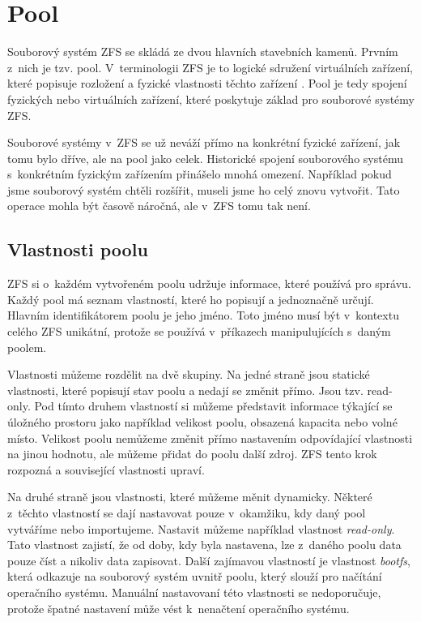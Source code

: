 \section{Pool}
Souborový systém ZFS se skládá ze dvou hlavních stavebních kamenů. Prvním z~nich je tzv. pool. V~terminologii ZFS je to logické sdružení virtuálních zařízení, které popisuje rozložení a fyzické vlastnosti těchto zařízení \cite{terminology}. Pool je tedy spojení fyzických nebo virtuálních zařízení, které poskytuje základ pro souborové systémy ZFS.

Souborové systémy v~ZFS se už neváží přímo na konkrétní fyzické zařízení, jak tomu bylo dříve, ale na pool jako celek. Historické spojení souborového systému s~konkrétním fyzickým zařízením přinášelo mnohá omezení. Například pokud jsme souborový systém chtěli rozšířit, museli jsme ho celý znovu vytvořit. Tato operace mohla být časově náročná, ale v~ZFS tomu tak není.
\subsection{Vlastnosti poolu}
ZFS si o~každém vytvořeném poolu udržuje informace, které používá pro správu. Každý pool má seznam vlastností, které ho popisují a jednoznačně určují.
Hlavním identifikátorem poolu je jeho jméno. Toto jméno musí být v~kontextu celého ZFS unikátní, protože se používá v~příkazech manipulujících s~daným poolem.

Vlastnosti můžeme rozdělit na dvě skupiny. Na jedné straně jsou statické vlastnosti, které popisují stav poolu a nedají se změnit přímo. Jsou tzv. read-only. Pod tímto druhem vlastností si můžeme představit informace týkající se úložného prostoru jako například velikost poolu, obsazená kapacita nebo volné místo. Velikost poolu nemůžeme změnit přímo nastavením odpovídající vlastnosti na jinou hodnotu, ale můžeme přidat do poolu další zdroj. ZFS tento krok rozpozná a související vlastnosti upraví.

Na druhé straně jsou vlastnosti, které můžeme měnit dynamicky. Některé z~těchto vlastností se dají nastavovat pouze v~okamžiku, kdy daný pool vytváříme nebo importujeme. Nastavit můžeme například vlastnost \emph{read-only}. Tato vlastnost zajistí, že od doby, kdy byla nastavena, lze z~daného poolu data pouze číst a nikoliv data zapisovat. Další zajímavou vlastností je vlastnost \emph{bootfs}, která odkazuje na souborový systém uvnitř poolu, který slouží pro načítání operačního systému. Manuální nastavovaní této vlastnosti se nedoporučuje, protože špatné nastavení může vést k~nenačtení operačního systému.

